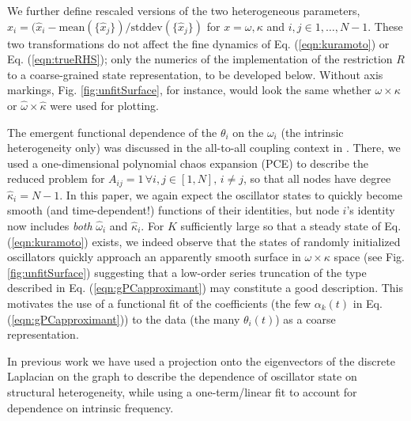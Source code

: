 \documentclass[numbers]{frontiersSCNS}
\newcommand{\degree}{\kappa}
\newcommand{\numNodes}{{N}}
\newcommand{\couplingK}{{K}}
\newcommand{\figRef}[1]{Fig. \ref{fig:#1}}
\newcommand{\eqnRef}[1]{Eq. (\ref{eqn:#1})}
\newcommand{\scalarFuncIndex}{k}
\begin{document}
We further define rescaled versions of the two heterogeneous parameters,
$x_i=(\hat x_i - \text{mean}(\{\hat x_j\}) / \text{stddev}(\{\hat x_j\})$ for
$x=\omega, \degree$
and
$i,j\in 1,\ldots,\numNodes-1$.
%
These two transformations do not affect the fine dynamics
of \eqnRef{kuramoto} or \eqnRef{trueRHS};
only the numerics of the implementation of the restriction $R$ to a coarse-grained state representation,
to be developed below.
%
Without axis markings, \figRef{unfitSurface}, for instance, would look the same
whether $\omega\times\degree$ or $\hat\omega\times\hat\degree$ were used for plotting.


The emergent functional dependence of the $\theta_i$ on the
$\omega_i$ (the intrinsic heterogeneity only) was discussed in the all-to-all coupling
context in \cite{Moon2005,Moon2006}.
%
There, we used a one-dimensional polynomial chaos expansion (PCE)
to describe the reduced problem
for $A_{ij}=1\,\forall i,j\in[1,\numNodes],\,i\neq j$,
so that all nodes
have degree $\hat\degree_i=\numNodes-1$.
%
In this paper, we again expect the oscillator states
to quickly become smooth (and time-dependent!)  functions of their identities,
but node $i$'s identity now includes \emph{both} $\hat\omega_i$ and $\hat\degree_i$.
%
For  $\couplingK$ sufficiently large so that a steady state of \eqnRef{kuramoto} exists,
we indeed observe that the states of randomly initialized oscillators quickly approach an
apparently smooth surface in $\omega \times \degree$ space
(see \figRef{unfitSurface})
%
%
suggesting that a low-order
series truncation of the type described in \eqnRef{gPCapproximant}
may constitute a good description.
%
This motivates the use of a functional fit of
the coefficients (the few $\alpha_{\scalarFuncIndex}(t)$ in \eqnRef{gPCapproximant})
to the data (the many $\theta_i(t)$)
as a coarse representation.


In previous work \cite{Rajendran2011} we have used a projection onto the eigenvectors of the discrete Laplacian
on the graph to describe the dependence of oscillator state on structural heterogeneity,
while using a one-term/linear fit
to account for dependence on intrinsic frequency.
%
\end{document}
